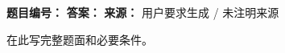 \begin{problemBox}
\begin{problemMeta}
\textbf{题目编号：}  \quad
\textbf{答案：}  \quad
\textbf{来源：} 用户要求生成 / 未注明来源
\end{problemMeta}

在此写完整题面和必要条件。
\end{problemBox}

